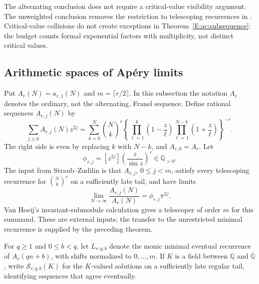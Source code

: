 \documentclass[11pt,a4paper]{article}
\theoremstyle{definition}
\theoremstyle{remark}
\numberwithin{equation}{section}
\begin{document}
The alternating conclusion does not require a critical-value visibility
argument. The unweighted conclusion removes the restriction to
telescoping recurrences in
\cite[Theorem 1.1]{AC_SZ}. Critical-value collisions do not create
exceptions in Theorem~\ref{E:ac:subsequence}: the budget counts formal
exponential factors with multiplicity, not distinct critical values.

\subsection{Arithmetic spaces of Ap\'ery limits}

Put $A_r(N)=a_{r,1}(N)$ and $m=\lceil r/2\rceil$. In this
subsection the notation $A_r$ denotes the ordinary, not the alternating,
Franel sequence. Define rational sequences $A_{r,j}(N)$ by
\begin{equation}\label{E:ac:deformation}
 \sum_{j\ge0}A_{r,j}(N)z^{2j}
 =\sum_{k=0}^N\binom Nk^r
 \left\{\prod_{\ell=1}^k\left(1-\frac z\ell\right)
        \prod_{\ell=1}^{N-k}\left(1+\frac z\ell\right)\right\}^{-r}.
\end{equation}
The right side is even by replacing $k$ with $N-k$, and
$A_{r,0}=A_r$. Let
\[
 \phi_{r,j}=[z^{2j}]\left(\frac z{\sin z}\right)^r
 \in\mathbb Q_{>0}.
\]
The input from Straub--Zudilin \cite[Theorem 1.3]{AC_SZ} is that
$A_{r,j}$, $0\le j<m$, satisfy every telescoping recurrence for
$\binom Nk^r$ on a sufficiently late tail, and have limits
\begin{equation}\label{E:ac:known-limits}
 \lim_{N\to\infty}\frac{A_{r,j}(N)}{A_r(N)}
             =\phi_{r,j}\pi^{2j}.
\end{equation}
Van Hoeij's invariant-submodule calculation
\cite[Remark 6]{AC_vH} gives a telescoper of order $m$ for this
summand. These are external inputs; the transfer to the unrestricted
minimal recurrence is supplied by the preceding theorem.

For $q\ge1$ and $0\le b<q$, let $L_{r;q,b}$ denote the monic
minimal eventual recurrence of $A_r(qn+b)$, with shifts normalized
to $0,\ldots,m$. If $K$ is a field between $\mathbb Q$ and
$\overline{\mathbb Q}$, write $\mathcal S_{r;q,b}(K)$ for the
$K$-valued solutions on a sufficiently late regular tail, identifying
sequences that agree eventually.
\end{document}
